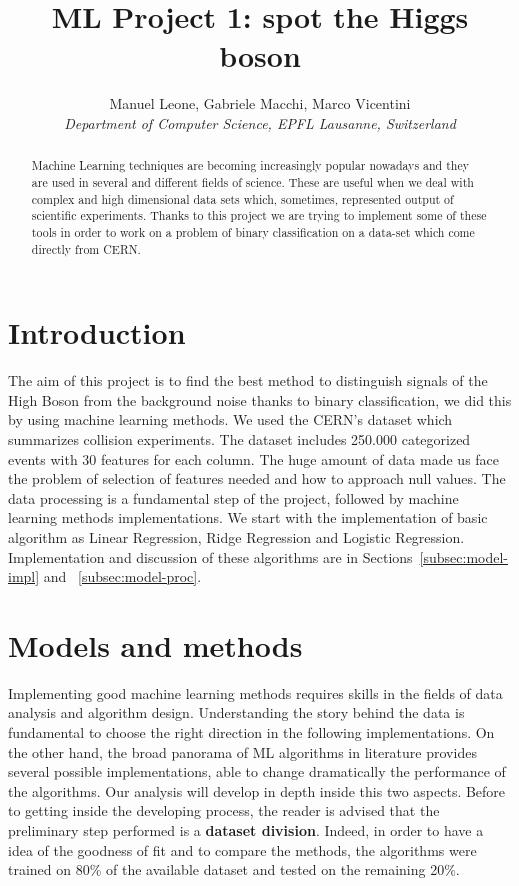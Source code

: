 \documentclass[10pt,article]{IEEEtran}
\begin{document}
\title{ML Project 1: spot the Higgs boson}

\author{
  Manuel Leone, Gabriele Macchi, Marco Vicentini\\
  \textit{Department of Computer Science, EPFL Lausanne, Switzerland}
}

\maketitle

\begin{abstract}
Machine Learning techniques are becoming increasingly popular nowadays and they are used in several and different fields of science.  These are useful when we deal with complex and high dimensional data sets which, sometimes, represented output of scientific experiments. Thanks to this project we are trying to implement some of these tools in order to work on a problem of binary classification on a data-set which come directly from CERN.
\end{abstract}

\section{Introduction}

The aim of this project is to find the best method to distinguish signals of the High Boson from the background noise thanks to binary classification, we did this by using machine learning methods. We used the CERN’s dataset which summarizes collision experiments. The dataset includes 250.000 categorized events with 30 features for each column. The huge amount of data made us face the problem of selection of features needed and how to approach null values. The data processing is a fundamental step of the project, followed by machine learning methods implementations. We start with the implementation of basic algorithm as Linear Regression, Ridge Regression and Logistic Regression. Implementation and discussion of these algorithms are in Sections~\ref{subsec:model-impl} and ~\ref{subsec:model-proc}.

\section{Models and methods}
\label{sec:models-methods}

Implementing good machine learning methods requires skills in the fields of data analysis and algorithm design. Understanding the story behind the data is fundamental to choose the right direction in the following implementations. On the other hand, the broad panorama of ML algorithms in literature provides several possible implementations, able to change dramatically the performance of the algorithms. Our analysis will develop in depth inside this two aspects.
Before to getting inside the developing process, the reader is advised that the preliminary step performed is a \textbf{dataset division}. Indeed, in order to have a idea of the  goodness of fit and to compare the methods, the algorithms were trained on 80\% of the available dataset and
tested on the remaining 20\%.
\end{document}

